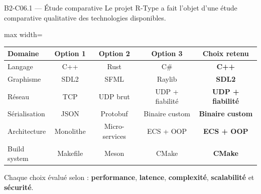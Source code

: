 \documentclass[aspectratio=169,10pt]{beamer}
\begin{document}
\begin{frame}{B2-C06.1 — Étude comparative}
\footnotesize
Le projet R-Type a fait l'objet d'une étude comparative qualitative des technologies disponibles.

\vspace{0.2em}
\begin{adjustbox}{max width=\textwidth}
\begin{tabular}{l c c c c}
\toprule
\textbf{Domaine} & \textbf{Option 1} & \textbf{Option 2} & \textbf{Option 3} & \textbf{Choix retenu} \\
\midrule
Langage       & C++          & Rust        & C\#          & \textbf{C++} \\ \hline
Graphisme     & SDL2         & SFML        & Raylib       & \textbf{SDL2} \\ \hline
Réseau        & TCP          & UDP brut    & UDP + fiabilité & \textbf{UDP + fiabilité} \\ \hline
Sérialisation & JSON         & Protobuf    & Binaire custom  & \textbf{Binaire custom} \\ \hline
Architecture  & Monolithe    & Micro-services & ECS + OOP  & \textbf{ECS + OOP} \\ \hline
Build system  & Makefile     & Meson       & CMake        & \textbf{CMake} \\
\bottomrule
\end{tabular}
\end{adjustbox}

\vspace{0.3em}
Chaque choix évalué selon : \textbf{performance}, \textbf{latence}, \textbf{complexité}, \textbf{scalabilité} et \textbf{sécurité}.

\vspace{0.2em}
\end{frame}
\end{document}
